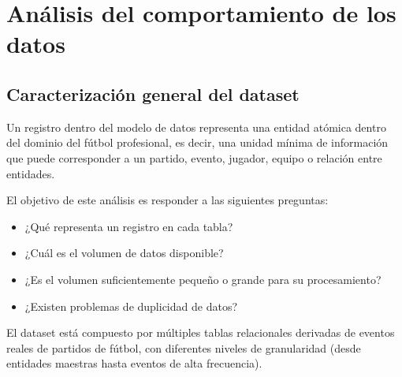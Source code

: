 \documentclass[12pt,a4paper]{article}
\begin{document}
\section{Análisis del comportamiento de los datos}

\subsection{Caracterización general del dataset}

Un registro dentro del modelo de datos representa una entidad atómica dentro del dominio del fútbol profesional, es decir, una unidad mínima de información que puede corresponder a un partido, evento, jugador, equipo o relación entre entidades.

El objetivo de este análisis es responder a las siguientes preguntas:
\begin{itemize}
    \item ¿Qué representa un registro en cada tabla?
    \item ¿Cuál es el volumen de datos disponible?
    \item ¿Es el volumen suficientemente pequeño o grande para su procesamiento?
    \item ¿Existen problemas de duplicidad de datos?
\end{itemize}

El dataset está compuesto por múltiples tablas relacionales derivadas de eventos reales de partidos de fútbol, con diferentes niveles de granularidad (desde entidades maestras hasta eventos de alta frecuencia).
\end{document}
